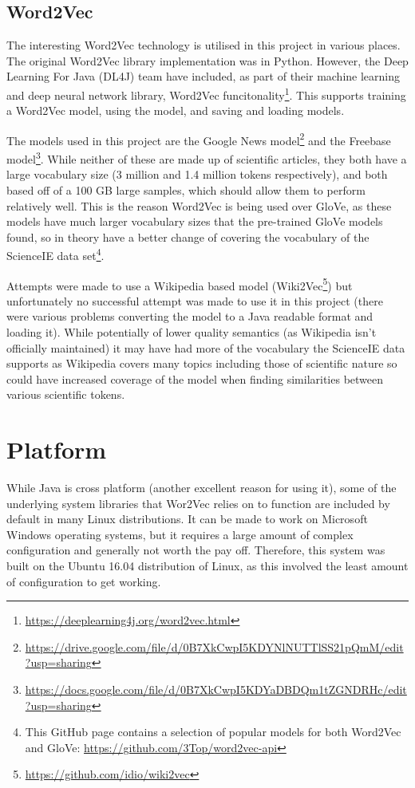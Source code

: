 \subsection*{Word2Vec}
The interesting Word2Vec technology is utilised in this project in various places. The original Word2Vec library implementation was in Python. However, the Deep Learning For Java (DL4J) team have included, as part of their machine learning and deep neural network library, Word2Vec funcitonality\footnote{\href{https://deeplearning4j.org/word2vec.html}{https://deeplearning4j.org/word2vec.html}}. This supports training a Word2Vec model, using the model, and saving and loading models. 

The models used in this project are the Google News model\footnote{\href{https://drive.google.com/file/d/0B7XkCwpI5KDYNlNUTTlSS21pQmM/edit?usp=sharing}{https://drive.google.com/file/d/0B7XkCwpI5KDYNlNUTTlSS21pQmM/edit?usp=sharing}} and the Freebase model\footnote{\href{https://docs.google.com/file/d/0B7XkCwpI5KDYaDBDQm1tZGNDRHc/edit?usp=sharing}{https://docs.google.com/file/d/0B7XkCwpI5KDYaDBDQm1tZGNDRHc/edit?usp=sharing}}. While neither of these are made up of scientific articles, they both have a large vocabulary size (3 million and 1.4 million tokens respectively), and both based off of a 100 GB large samples, which should allow them to perform relatively well. This is the reason Word2Vec is being used over GloVe, as these models have much larger vocabulary sizes that the pre-trained GloVe models found, so in theory have a better change of covering the vocabulary of the ScienceIE data set\footnote{This GitHub page contains a selection of popular models for both Word2Vec and GloVe: \href{https://github.com/3Top/word2vec-api}{https://github.com/3Top/word2vec-api}}.

Attempts were made to use a Wikipedia based model (Wiki2Vec\footnote{\href{https://github.com/idio/wiki2vec}{https://github.com/idio/wiki2vec}}) but unfortunately no successful attempt was made to use it in this project (there were various problems converting the model to a Java readable format and loading it). While potentially of lower quality semantics (as Wikipedia isn't officially maintained) it may have had more of the vocabulary the ScienceIE data supports as Wikipedia covers many topics including those of scientific nature so could have increased coverage of the model when finding similarities between various scientific tokens. 

\section{Platform}
While Java is cross platform (another excellent reason for using it), some of the underlying system libraries that Wor2Vec relies on to function are included by default in many Linux distributions. It can be made to work on Microsoft Windows operating systems, but it requires a large amount of complex configuration and generally not worth the pay off. Therefore, this system was built on the Ubuntu 16.04 distribution of Linux, as this involved the least amount of configuration to get working.


